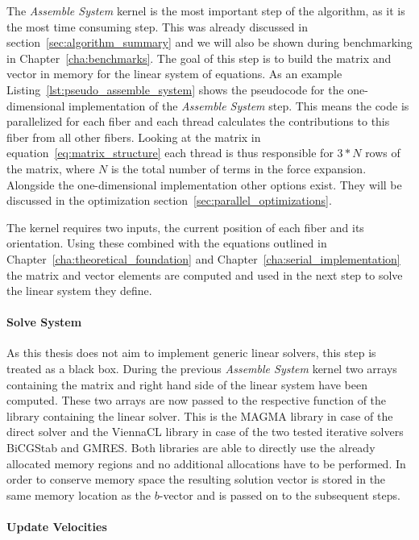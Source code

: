 The \emph{Assemble System} kernel is the most important step of the algorithm, as it is the most time consuming step. This was already discussed in section~\ref{sec:algorithm_summary} and we will also be shown during benchmarking in Chapter~\ref{cha:benchmarks}. The goal of this step is to build the matrix and vector in memory for the linear system of equations. As an example Listing~\ref{lst:pseudo_assemble_system} shows the pseudocode for the one-dimensional implementation of the \emph{Assemble System} step. This means the code is parallelized for each fiber and each thread calculates the contributions to this fiber from all other fibers. Looking at the matrix in equation~\eqref{eq:matrix_structure} each thread is thus responsible for $3*N$ rows of the matrix, where $N$ is the total number of terms in the force expansion. Alongside the one-dimensional implementation other options exist. They will be discussed in the optimization section~\ref{sec:parallel_optimizations}.

The kernel requires two inputs, the current position of each fiber and its orientation. Using these combined with the equations outlined in Chapter~\ref{cha:theoretical_foundation} and Chapter~\ref{cha:serial_implementation} the matrix and vector elements are computed and used in the next step to solve the linear system they define.

\paragraph{Solve System}
As this thesis does not aim to implement generic linear solvers, this step is treated as a black box. During the previous \emph{Assemble System} kernel two arrays containing the matrix and right hand side of the linear system have been computed. These two arrays are now passed to the respective function of the library containing the linear solver. This is the MAGMA library in case of the direct solver and the ViennaCL library in case of the two tested iterative solvers BiCGStab and GMRES. Both libraries are able to directly use the already allocated memory regions and no additional allocations have to be performed. In order to conserve memory space the resulting solution vector is stored in the same memory location as the $b$-vector and is passed on to the subsequent steps.

\paragraph{Update Velocities}

